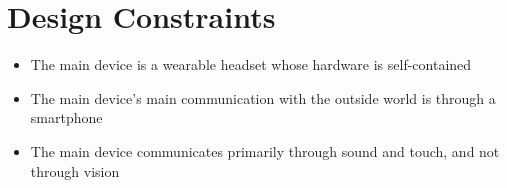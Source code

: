 \section{Design Constraints}
\begin{itemize}
\item The main device is a wearable headset whose hardware is self-contained
\item The main device’s main communication with the outside world is through a smartphone
\item The main device communicates primarily through sound and touch, and not through vision
\end{itemize}
